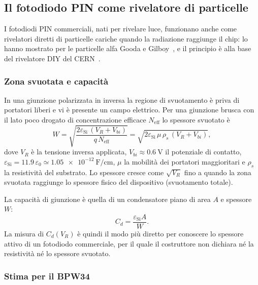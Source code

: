 \documentclass[11pt,a4paper]{article}
\begin{document}
\subsection{Il fotodiodo PIN come rivelatore di particelle}
I fotodiodi PIN commerciali, nati per rivelare luce, funzionano anche come rivelatori diretti di particelle cariche quando la radiazione raggiunge il chip: lo hanno mostrato per le particelle alfa Gooda e Gilboy~\cite{gooda1987}, e il principio è alla base del rivelatore DIY del CERN~\cite{keller2019}.

\subsubsection{Zona svuotata e capacità}

In una giunzione polarizzata in inversa la regione di svuotamento è priva di portatori liberi e vi è presente un campo elettrico. Per una giunzione brusca con il lato poco drogato di concentrazione efficace $N_{\mathrm{eff}}$ lo spessore svuotato è~\cite{sze2007,knoll2010,lutz1999}
\begin{equation}
  W = \sqrt{\frac{2\varepsilon_{\mathrm{Si}}\,(V_R + V_{bi})}{q\,N_{\mathrm{eff}}}} = \sqrt{2\varepsilon_{\mathrm{Si}}\,\mu\,\rho_s\,(V_R+V_{bi})},
  \label{eq:W}
\end{equation}
dove $V_R$ è la tensione inversa applicata, $V_{bi}\approx\SI{0.6}{\volt}$ il potenziale di contatto, $\varepsilon_{\mathrm{Si}} = 11.9\,\varepsilon_0 \simeq \SI{1.05e-12}{\farad\per\centi\metre}$, $\mu$ la mobilità dei portatori maggioritari e $\rho_s$ la resistività del substrato. Lo spessore cresce come $\sqrt{V_R}$ fino a quando la zona svuotata raggiunge lo spessore fisico del dispositivo (svuotamento totale).

La capacità di giunzione è quella di un condensatore piano di area $A$ e spessore $W$:
\begin{equation}
  C_d = \frac{\varepsilon_{\mathrm{Si}} A}{W}.
  \label{eq:Cd}
\end{equation}
La misura di $C_d(V_R)$ è quindi il modo più diretto per conoscere lo spessore attivo di un fotodiodo commerciale, per il quale il costruttore non dichiara né la resistività né lo spessore svuotato.

\subsubsection{Stima per il BPW34}
\end{document}
